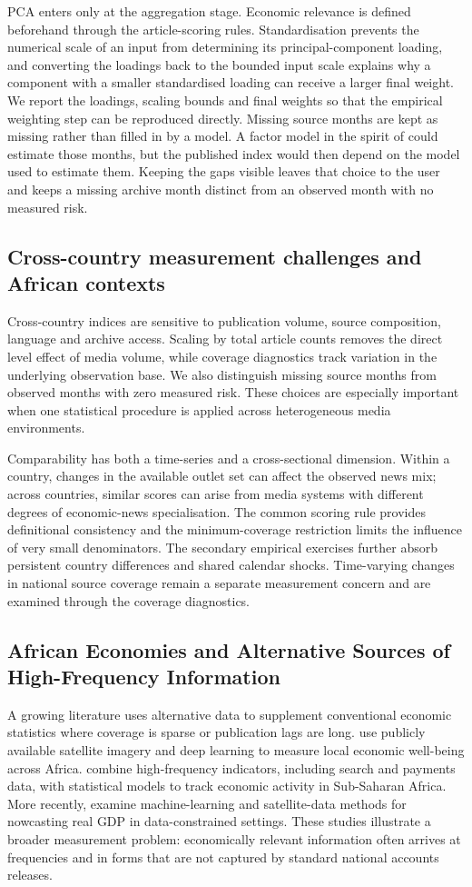 \documentclass[12pt]{article}
\begin{document}
PCA enters only at the aggregation stage. Economic relevance is defined beforehand through the article-scoring rules. Standardisation prevents the numerical scale of an input from determining its principal-component loading, and converting the loadings back to the bounded input scale explains why a component with a smaller standardised loading can receive a larger final weight. We report the loadings, scaling bounds and final weights so that the empirical weighting step can be reproduced directly. Missing source months are kept as missing rather than filled in by a model. A factor model in the spirit of \citet{banbura2014} could estimate those months, but the published index would then depend on the model used to estimate them. Keeping the gaps visible leaves that choice to the user and keeps a missing archive month distinct from an observed month with no measured risk.
\subsection{Cross-country measurement challenges and African contexts}
Cross-country indices are sensitive to publication volume, source composition, language and archive access. Scaling by total article counts removes the direct level effect of media volume, while coverage diagnostics track variation in the underlying observation base. We also distinguish missing source months from observed months with zero measured risk. These choices are especially important when one statistical procedure is applied across heterogeneous media environments.

Comparability has both a time-series and a cross-sectional dimension. Within a country, changes in the available outlet set can affect the observed news mix; across countries, similar scores can arise from media systems with different degrees of economic-news specialisation. The common scoring rule provides definitional consistency and the minimum-coverage restriction limits the influence of very small denominators. The secondary empirical exercises further absorb persistent country differences and shared calendar shocks. Time-varying changes in national source coverage remain a separate measurement concern and are examined through the coverage diagnostics.
\subsection{African Economies and Alternative Sources of High-Frequency Information}
A growing literature uses alternative data to supplement conventional economic statistics where coverage is sparse or publication lags are long. \citet{yeh2020} use publicly available satellite imagery and deep learning to measure local economic well-being across Africa. \citet{buell2021} combine high-frequency indicators, including search and payments data, with statistical models to track economic activity in Sub-Saharan Africa. More recently, \citet{fotopoulou2026} examine machine-learning and satellite-data methods for nowcasting real GDP in data-constrained settings. These studies illustrate a broader measurement problem: economically relevant information often arrives at frequencies and in forms that are not captured by standard national accounts releases.
\end{document}
